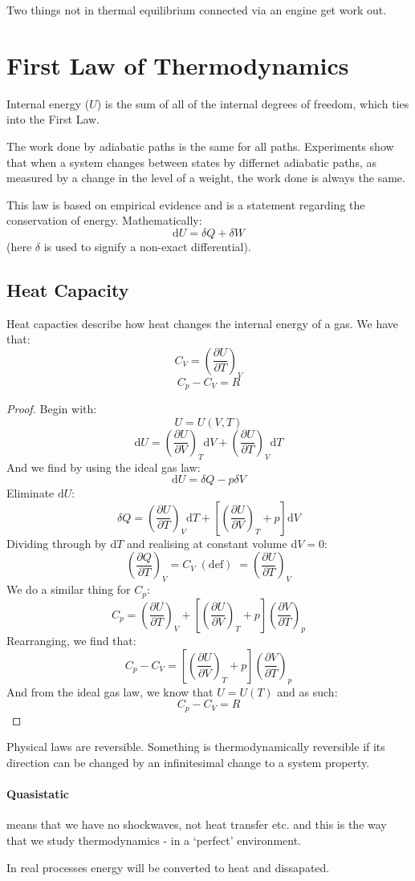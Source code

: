 Two things not in thermal equilibrium connected via an engine get work out.

\section{First Law of Thermodynamics}
Internal energy ($U$) is the sum of all of the internal degrees of freedom,
which ties into the First Law.

The work done by adiabatic paths is the same for all paths. Experiments show
that when a system changes between states by differnet adiabatic paths, as
measured by a change in the level of a weight, the work done is always the
same.

This law is based on empirical evidence and is a statement regarding the
conservation of energy. Mathematically:
$$
	\mathrm{d}U = \delta Q + \delta W
$$
(here $\delta$ is used to signify a non-exact differential).

\subsection{Heat Capacity}
Heat capacties describe how heat changes the internal energy of a gas. We have
that:
$$
	C_V = \left(\frac{\partial U}{\partial T}\right)_V
$$
$$
	C_p - C_V = R
$$
\begin{proof}
Begin with:
$$
	U = U(V,T)
$$
$$
	\mathrm{d}U = \left(\frac{\partial U}{\partial V}\right)_T \mathrm{d}V +
	\left(\frac{\partial U}{\partial T}\right)_V \mathrm{d}T
$$
And we find by using the ideal gas law:
$$
	\mathrm{d}U = \delta Q - p \delta V
$$
Eliminate $\mathrm{d}U$:
$$
	\delta Q = \left(\frac{\partial U}{\partial T}\right)_V \mathrm{d}T + 
	\left[
		\left(\frac{\partial U}{\partial V}\right)_T + p
	\right] \mathrm{d}V
$$
Dividing through by d$T$ and realising at constant volume d$V = 0$:
$$
	\left(\frac{\partial Q}{\partial T}\right)_V = C_V \;(\mathrm{def})\; =
	\left(\frac{\partial U}{\partial T}\right)_V
$$
We do a similar thing for $C_p$:
$$
	C_p = \left(\frac{\partial U}{\partial T}\right)_V + 
	\left[
		\left(\frac{\partial U}{\partial V}\right)_T + p
	\right] \left(\frac{\partial V}{\partial T}\right)_p
$$
Rearranging, we find that:
$$
	C_p - C_V = \left[
	\left(\frac{\partial U}{\partial V}\right)_T + p
	\right] \left(\frac{\partial V}{\partial T}\right)_p
$$
And from the ideal gas law, we know that $U = U(T)$ and as such:
$$
	C_p - C_V = R
$$
\end{proof}

Physical laws are reversible. Something is thermodynamically reversible if its
direction can be changed by an infinitesimal change to a system property.
\paragraph{Quasistatic} means that we have no shockwaves, not heat transfer
etc. and this is the way that we study thermodynamics - in a `perfect'
environment.

In real processes energy will be converted to heat and dissapated.
